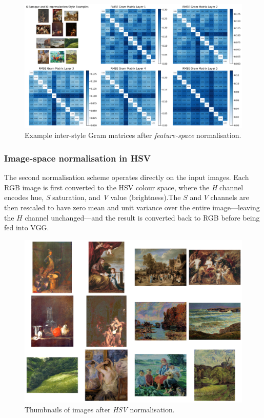 \documentclass[a4paper,11pt]{article}
\begin{document}
\begin{figure}[htbp]
  \centering
  \includegraphics[width=\textwidth]{../figures/rmse_featurenorm.png}
  \caption{Example inter-style Gram matrices after \emph{feature-space} normalisation.}
  \label{fig:gram_norm}
\end{figure}

\subsubsection{Image-space normalisation in HSV}
The second normalisation scheme operates directly on the input images. Each RGB image is first converted to the HSV colour space, where the \emph{H} channel encodes hue, \emph{S} saturation, and \emph{V} value (brightness).The \(S\) and \(V\) channels are then rescaled to have zero mean and unit variance over the entire image—leaving the \(H\) channel unchanged—and the result is converted back to RGB before being fed into VGG.

\begin{figure}[htbp]
  \centering
  \includegraphics[width=\textwidth]{../figures/HSV_normalized.png}
  \caption{Thumbnails of images after \emph{HSV} normalisation.}
  \label{fig:hsv_examples}
\end{figure}
\end{document}
